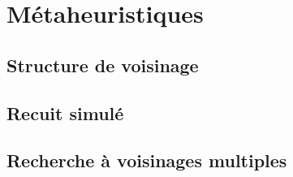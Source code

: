 \documentclass[12pt]{article}
\begin{document}
\section{Métaheuristiques}

\subsection{Structure de voisinage}

\subsection{Recuit simulé}

\subsection{Recherche à voisinages multiples}
\end{document}
